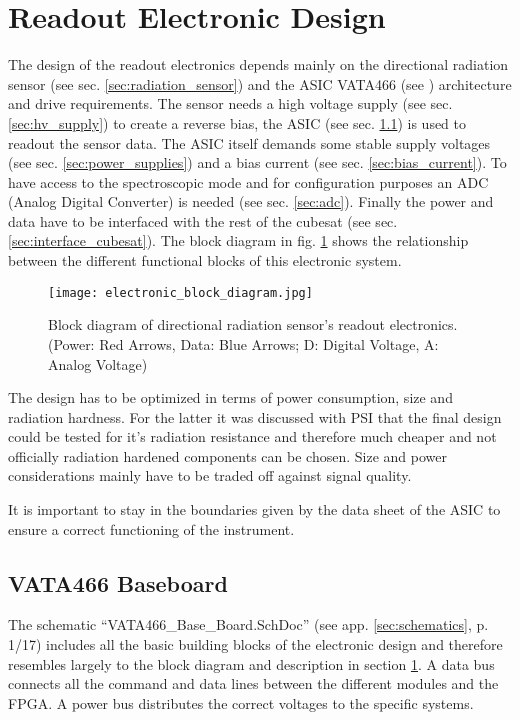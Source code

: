 \section{Readout Electronic Design}
\label{sec:electronic_design}
The design of the readout electronics depends mainly on the directional radiation sensor (see sec. \ref{sec:radiation_sensor}) and the ASIC VATA466 (see \cite{Meier2016VATA466}) architecture and drive requirements.
The sensor needs a high voltage supply (see sec. \ref{sec:hv_supply}) to create a reverse bias, the ASIC (see sec. \ref{sec:vata466_baseboard}) is used to readout the sensor data.
The ASIC itself demands some stable supply voltages (see sec. \ref{sec:power_supplies}) and a bias current (see sec. \ref{sec:bias_current}).
To have access to the spectroscopic mode and for configuration purposes an ADC (Analog Digital Converter) is needed (see sec. \ref{sec:adc}).
Finally the power and data have to be interfaced with the rest of the cubesat (see sec. \ref{sec:interface_cubesat}).
The block diagram in fig. \ref{fig:electronic_block_diagram} shows the relationship between the different functional blocks of this electronic system.
\begin{figure}[H]
    \centering
    \texttt{[image: electronic\_block\_diagram.jpg]}
    \caption[Block Diagram Readout Electronics]{Block diagram of directional radiation sensor's readout electronics. \\(Power: Red Arrows, Data: Blue Arrows; D: Digital Voltage, A: Analog Voltage)}
    \label{fig:electronic_block_diagram}
\end{figure}

The design has to be optimized in terms of power consumption, size and radiation hardness. 
For the latter it was discussed with PSI that the final design could be tested for it's radiation resistance and therefore much cheaper and not officially radiation hardened components can be chosen.
Size and power considerations mainly have to be traded off against signal quality.

It is important to stay in the boundaries given by the data sheet of the ASIC to ensure a correct functioning of the instrument.

\subsection{VATA466 Baseboard}
\label{sec:vata466_baseboard}
The schematic ``VATA466\_Base\_Board.SchDoc'' (see app. \ref{sec:schematics}, p. 1/17) includes all the basic building blocks of the electronic design and therefore resembles largely to the block diagram and description in section \ref{sec:electronic_design}.
A data bus connects all the command and data lines between the different modules and the FPGA.
A power bus distributes the correct voltages to the specific systems.


